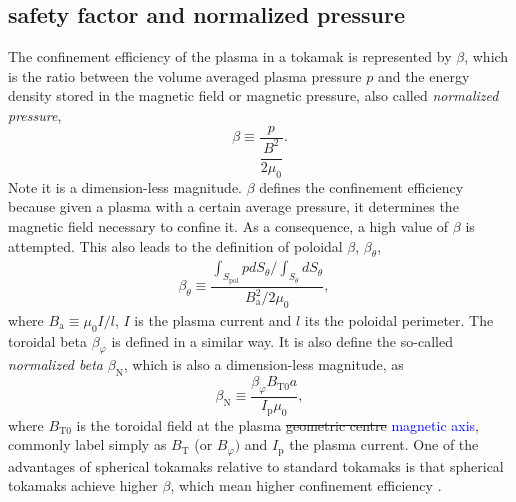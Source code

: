 \documentclass[a4paper,12pt,oneside]{book}
\begin{document}
\subsection{safety factor and normalized pressure} %
\label{section q beta}
The confinement efficiency of the plasma in a tokamak is represented by $\beta$, which is the ratio between the volume averaged plasma pressure $p$ and the energy density stored in the magnetic field or magnetic pressure, also called \textit{normalized pressure},
%
\begin{equation} \label{def beta}
\beta \equiv \dfrac{p}{\dfrac{B^2}{2 \mu_{0}}}.
\end{equation}
%
Note it is a dimension-less magnitude. $\beta$ defines the confinement efficiency because given a plasma with a certain average pressure, it determines the magnetic field necessary to confine it. As a consequence, a high value of $\beta$ is attempted. This also leads to the definition of poloidal $\beta$, $\beta_{\theta}$,
%
\begin{equation}
\begin{array}{cc}

\beta_{\theta} \equiv \dfrac{\int_{S_\text{pol}} p dS_\theta / \int_{S_\theta} dS_\theta}{B_\text{a}^2/2 \mu_0}, &
\end{array}
\end{equation}
%
where $B_\text{a} \equiv \mu_0 I/l$, $I$ is the plasma current and $l$ its the poloidal perimeter. The toroidal beta $\beta_\varphi$ is defined in a similar way. It is also define the so-called \textit{normalized beta} $\beta_\text{N}$, which is also a dimension-less magnitude, as
%
\begin{equation}
\beta_\text{N} \equiv \dfrac{\beta_\varphi B_{\text{T}0} a}{I_\text{p} \mu_0},
\end{equation}
%
where $B_{\text{T}0}$ is the toroidal field at the plasma \st{geometric centre} \textcolor{blue}{magnetic axis}, commonly label simply as $B_\text{T}$ (or $B_\varphi)$ and $I_\text{p}$ the plasma current. One of the advantages of spherical tokamaks relative to standard tokamaks is that spherical tokamaks achieve higher $\beta$, which mean higher confinement efficiency \cite{ST_vs_T}.
\end{document}
